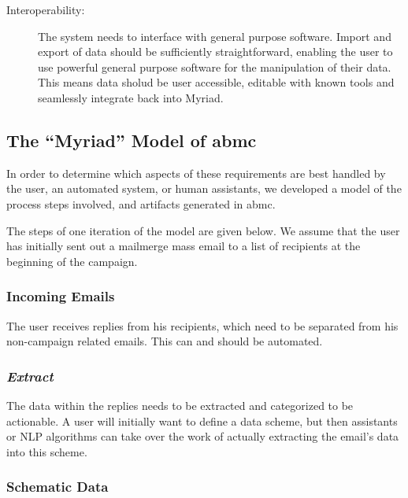 \begin{description}

\item[Interoperability:] The system needs to interface with general purpose software. Import and export of data should be sufficiently straightforward, enabling the user to use powerful general purpose software for the manipulation of their data. This means data sholud be user accessible, editable with known tools and seamlessly integrate back into Myriad.

\end{description}

\subsection{The ``Myriad'' Model of \gls{abmc}}

In order to determine which aspects of these requirements are best handled by the user, an automated system, or human assistants, we developed a model of the process steps involved, and artifacts generated in \gls{abmc}.


The steps of one iteration of the model are given below. We assume that the user has initially sent out a mailmerge mass email to a list of recipients at the beginning of the campaign.

\subsubsection*{Incoming Emails}

The user receives replies from his recipients, which need to be separated from his non-campaign related emails. This can and should be automated.

\subsubsection*{\emph{Extract}}

The data within the replies needs to be extracted and categorized to be actionable. A user will initially want to define a data scheme, but then assistants or NLP algorithms can take over the work of actually extracting the email's data into this scheme.

\subsubsection*{Schematic Data}

